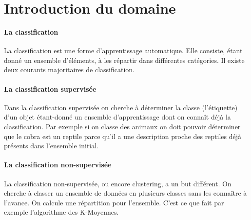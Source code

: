 \section{Introduction du domaine}
\paragraph{La classification}

La classification est une forme d’apprentissage automatique. Elle consiste,
étant donné un ensemble d’éléments, à les répartir dans différentes catégories. Il existe
deux courants majoritaires de classification.

\paragraph{La classification supervisée}


Dans la classification supervisée on cherche à déterminer la classe (l'étiquette) d'un objet
étant-donné un ensemble d’apprentissage dont on connaît déjà la classification. Par
exemple si on classe des animaux on doit pouvoir déterminer que le cobra est un
reptile parce qu’il a une description proche des reptiles déjà présents dans l’ensemble
initial.

\paragraph{La classification non-supervisée}

La classification non-supervisée, ou encore clustering, a un but différent. On
cherche à classer un ensemble de données en plusieurs classes sans les connaître à
l’avance. On calcule une répartition pour l’ensemble. C’est ce que fait par exemple
l’algorithme des K-Moyennes.



\newpage